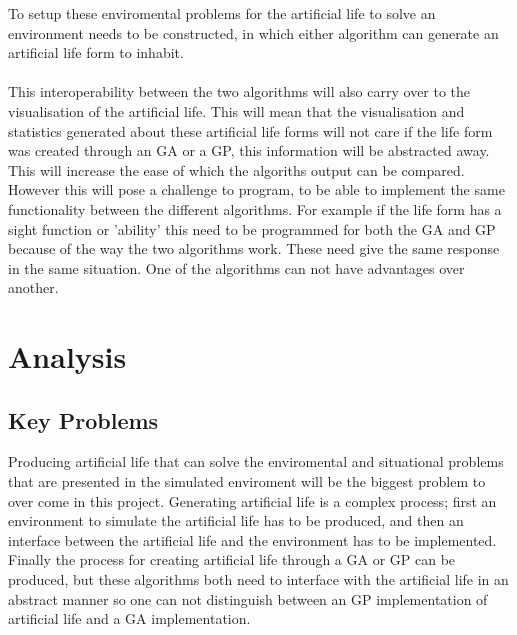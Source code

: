 \documentclass[12pt]{article}
\begin{document}
To setup these enviromental problems for the artificial life to solve an environment needs to be constructed, in which either algorithm can generate an artificial life form
to inhabit.

\paragraph{}
This interoperability between the two algorithms will also carry over to the visualisation of the artificial life. This will mean
that the visualisation and statistics generated about these artificial life forms will not care if the life form was created
through an GA or a GP, this information will be abstracted away. This will increase the ease of which the algoriths output can
be compared. However this will pose a challenge to program, to be able to implement the same functionality between the 
different algorithms. For example if the life form has a sight function or 'ability' this need to be programmed for both
the GA and GP because of the way the two algorithms work. These need give the same response in the same situation. One of the
algorithms can not have advantages over another.
	

\section{Analysis}

\subsection{Key Problems}
Producing artificial life that can solve the enviromental and situational problems that are presented in the simulated enviroment %
will be the biggest problem to over come in this project. Generating artificial life is a complex process; first an environment to simulate the artificial life has to be produced, and then
an interface between the artificial life and the environment has to be implemented. Finally the process for creating artificial life through a GA or GP can be produced, but these algorithms
both need to interface with the artificial life in an abstract manner so one can not distinguish between an GP implementation of artificial life and a GA implementation.
\end{document}
